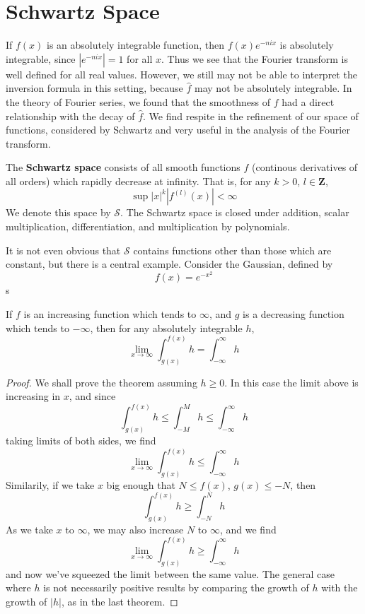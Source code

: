 \section{Schwartz Space}

If $f(x)$ is an absolutely integrable function, then $f(x) e^{-nix}$ is absolutely integrable, since $|e^{-nix}| = 1$ for all $x$. Thus we see that the Fourier transform is well defined for all real values. However, we still may not be able to interpret the inversion formula in this setting, because $\widehat{f}$ may not be absolutely integrable. In the theory of Fourier series, we found that the smoothness of $f$ had a direct relationship with the decay of $\widehat{f}$. We find respite in the refinement of our space of functions, considered by Schwartz and very useful in the analysis of the Fourier transform.

The {\bf Schwartz space} consists of all smooth functions $f$ (continous derivatives of all orders) which rapidly decrease at infinity. That is, for any $k > 0$, $l \in \mathbf{Z}$,
%
\[ \sup |x|^k |f^{(l)}(x)| < \infty \]
%
We denote this space by $\mathcal{S}$. The Schwartz space is closed under addition, scalar multiplication, differentiation, and multiplication by polynomials.

It is not even obvious that $\mathcal{S}$ contains functions other than those which are constant, but there is a central example. Consider the Gaussian, defined by
%
\[ f(x) = e^{-x^2} \]
%
s

\begin{lemma}
    If $f$ is an increasing function which tends to $\infty$, and $g$ is a decreasing function which tends to $-\infty$, then for any absolutely integrable $h$,
    \[ \lim_{x \to \infty} \int_{g(x)}^{f(x)} h = \int_{-\infty}^\infty h \]
\end{lemma}
\begin{proof}
    We shall prove the theorem assuming $h \geq 0$. In this case the limit above is increasing in $x$, and since
    \[ \int_{g(x)}^{f(x)} h \leq \int_{-M}^{M} h \leq \int_{-\infty}^\infty h \]
    taking limits of both sides, we find
    \[ \lim_{x \to \infty}  \int_{g(x)}^{f(x)} h \leq \int_{-\infty}^\infty h \]
    Similarily, if we take $x$ big enough that $N \leq f(x)$, $g(x) \leq -N$, then
    \[ \int_{g(x)}^{f(x)} h \geq \int_{-N}^N h \]
    As we take $x$ to $\infty$, we may also increase $N$ to $\infty$, and we find
    \[ \lim_{x \to \infty} \int_{g(x)}^{f(x)} h \geq \int_{-\infty}^\infty h \]
    and now we've squeezed the limit between the same value. The general case where $h$ is not necessarily positive results by comparing the growth of $h$ with the growth of $|h|$, as in the last theorem.
\end{proof}

